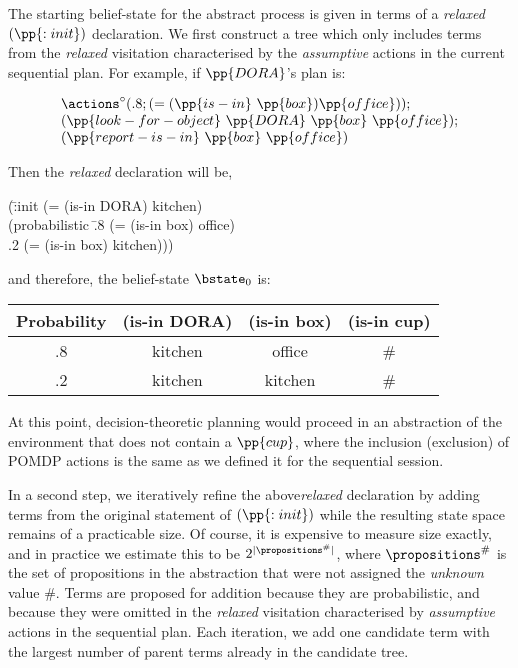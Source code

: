 The starting belief-state for the abstract process is given in terms
of a {\em relaxed} $(\pp{:init})$ declaration.  We first construct a
tree which only includes terms from the {\em relaxed} visitation
characterised by the {\em assumptive} actions in the current
sequential plan. For example, if $\pp{DORA}$'s plan is:

\[
\begin{array}{l}
\actions^{\circ}(.8;(=(\pp{is-in}~\pp{box})\pp{office}));\\
(\pp{look-for-object}~\pp{DORA}~\pp{box}~\pp{office});\\
(\pp{report-is-in}~\pp{box}~\pp{office})
\end{array}
\]

\noindent Then the {\em relaxed} declaration will be,

\small
\begin{tabtt}
(\=:init (= (is-in DORA) kitchen) \+ \\
       (probabilistic \=.8 (= (is-in box) office)  \\
		      \>.2 (= (is-in box) kitchen))) \\
\end{tabtt}
\normalsize

\noindent and therefore, the belief-state $\bstate_0$ is:

\small
\begin{tabular}{cccc}
\hline
Probability & (is-in DORA)  & (is-in box)  & (is-in cup) \\
\hline
.8 & kitchen & office & \# \\
.2 & kitchen & kitchen & \# \\
\hline
\end{tabular}
\normalsize

\noindent At this point, decision-theoretic planning would proceed in an
abstraction of the environment that does not contain a $\pp{cup}$,
where the inclusion (exclusion) of POMDP actions is the same as we
defined it for the sequential session.

In a second step, we iteratively refine the above{\em relaxed}
declaration by adding terms from the original statement of
$(\pp{:init})$ while the resulting state space remains of a
practicable size. Of course, it is expensive to measure size exactly,
and in practice we estimate this to be $2^{|\propositions^\#|}$, where
$\propositions^\#$ is the set of propositions in the abstraction that
were not assigned the {\em unknown} value \#. Terms are proposed for
addition because they are probabilistic, and because they were omitted
in the {\em relaxed} visitation characterised by {\em assumptive}
actions in the sequential plan. Each iteration, we add one candidate
term with the largest number of parent terms already in the candidate
tree.









